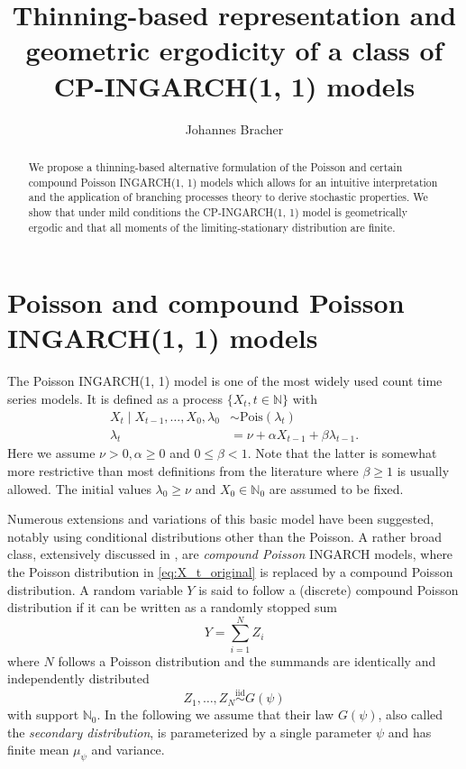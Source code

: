 \documentclass[10pt,a4paper]{article}
\begin{document}
\title{Thinning-based representation and geometric ergodicity of a class of CP-INGARCH(1, 1) models}
\author{Johannes Bracher}

\maketitle

\newcommand{\juv}{S}

\begin{abstract}
We propose a thinning-based alternative formulation of the Poisson and certain compound Poisson INGARCH(1, 1) models which allows for an intuitive interpretation and the application of branching processes theory to derive stochastic properties. We show that under mild conditions the CP-INGARCH(1, 1) model is geometrically ergodic and that all moments of the limiting-stationary distribution are finite.
\end{abstract}

\section{Poisson and compound Poisson INGARCH(1, 1) models}
\label{sec:alternative_formulation}

The Poisson INGARCH(1, 1) model \cite{Ferland2006, Fokianos2009} is one of the most widely used count time series models. It is defined as a process $\{X_t, t \in \mathbb{N}\}$ with
\begin{align}
X_t \mid X_{t - 1}, \dots, X_0, \lambda_0 & \sim \text{Pois}(\lambda_t)\label{eq:X_t_original}\\
\lambda_t & = \nu + \alpha X_{t - 1} + \beta \lambda_{t - 1}. \label{eq:lambda_t}
\end{align}
Here we assume $\nu > 0, \alpha \geq 0$ and $0 \leq \beta < 1$. Note that the latter is somewhat more restrictive than most definitions from the literature where $\beta \geq 1$ is usually allowed. The initial values $\lambda_0 \geq \nu$ and $X_0 \in \mathbb{N}_0$ are assumed to be fixed.

Numerous extensions and variations of this basic model have been suggested, notably using conditional distributions other than the Poisson. A rather broad class, extensively discussed in \cite{Goncalves2015}, are \textit{compound Poisson} INGARCH models, where the Poisson distribution in \eqref{eq:X_t_original} is replaced by a compound Poisson distribution. A random variable $Y$ is said to follow a (discrete) compound Poisson distribution \cite[Chapter 3]{Feller1968} if it can be written as a randomly stopped sum 
$$
Y = \sum_{i = 1}^N Z_i
$$
where $N$ follows a Poisson distribution and the summands are identically and independently distributed
$$
Z_1, \dots, Z_N \stackrel{\text{iid}}{\sim} G(\psi)
$$
with support $\mathbb{N}_0$. In the following we assume that their law $G(\psi)$, also called the \textit{secondary distribution}, is parameterized by a single parameter $\psi$ and has finite mean $\mu_\psi$ and variance.
\end{document}
